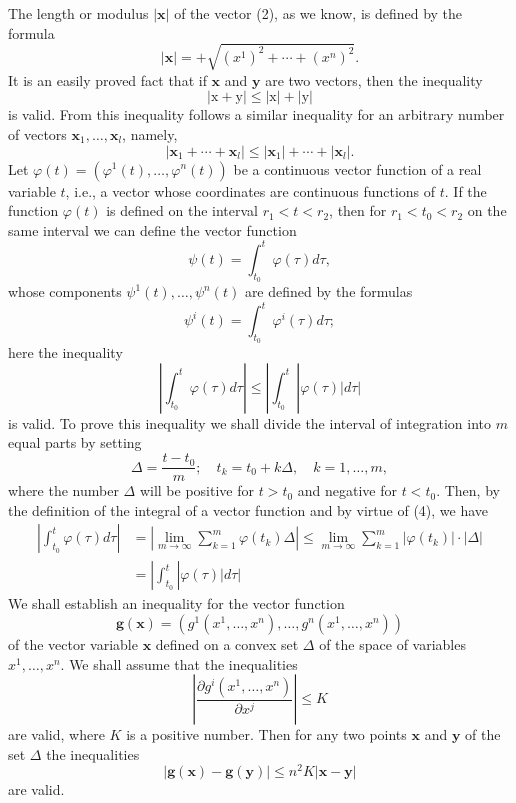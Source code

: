 \documentclass[10pt,a5paper]{book}
\theoremstyle{plain}
\theoremstyle{definition}
\theoremstyle{remark}
\begin{document}
The length or modulus $|\mathbf{x}|$ of the vector (2), as we know, is defined by the formula
\[
|\mathbf{x}|=+\sqrt{\left(x^{1}\right)^{2}+\cdots+\left(x^{n}\right)^{2}} .
\]
It is an easily proved fact that if $\mathbf{x}$ and $\mathbf{y}$ are two vectors, then the inequality
\[
|\mathrm{x}+\mathrm{y}| \leq|\mathrm{x}|+|\mathrm{y}|
\]
is valid. From this inequality follows a similar inequality for an arbitrary number of vectors $\mathbf{x}_{1}, \ldots, \mathbf{x}_{l}$, namely,
\begin{equation*}
\left|\mathbf{x}_{1}+\cdots+\mathbf{x}_{l}\right| \leq\left|\mathbf{x}_{1}\right|+\cdots+\left|\mathbf{x}_{l}\right| . \tag{4}
\end{equation*}
Let $\varphi(t)=\left(\varphi^{1}(t), \ldots, \varphi^{n}(t)\right)$ be a continuous vector function of a real variable $t$, i.e., a vector whose coordinates are continuous functions of $t$. If the function $\varphi(t)$ is defined on the interval $r_{1}<t<r_{2}$, then for $r_{1}<t_{0}<r_{2}$ on the same interval we can define the vector function
\[
\psi(t)=\int_{t_{0}}^{t} \varphi(\tau) d \tau,
\]
whose components $\psi^{1}(t), \ldots, \psi^{n}(t)$ are defined by the formulas
\[
\psi^{i}(t)=\int_{t_{0}}^{t} \varphi^{i}(\tau) d \tau ;
\]
here the inequality
\begin{equation*}
\left|\int_{t_{0}}^{t} \varphi(\tau) d \tau\right| \leq\left|\int_{t_{0}}^{t}\right| \varphi(\tau)|d \tau| \tag{5}
\end{equation*}
is valid. To prove this inequality we shall divide the interval of integration into $m$ equal parts by setting
\[
\Delta=\frac{t-t_{0}}{m} ; \quad t_{k}=t_{0}+k \Delta, \quad k=1, \ldots, m,
\]
where the number $\Delta$ will be positive for $t>t_{0}$ and negative for $t<t_{0}$. Then, by the definition of the integral of a vector function and by virtue
of (4), we have
\[
\begin{aligned}
\left|\int_{t_{0}}^{t} \varphi(\tau) d \tau\right| & =\left|\lim _{m \rightarrow \infty} \sum_{k=1}^{m} \varphi\left(t_{k}\right) \Delta\right| \leq \lim _{m \rightarrow \infty} \sum_{k=1}^{m}\left|\varphi\left(t_{k}\right)\right| \cdot|\Delta| \\
& =\left|\int_{t_{0}}^{t}\right| \varphi(\tau)|d \tau|
\end{aligned}
\]
We shall establish an inequality for the vector function
\[
\mathbf{g}(\mathbf{x})=\left(g^{1}\left(x^{1}, \ldots, x^{n}\right), \ldots, g^{n}\left(x^{1}, \ldots, x^{n}\right)\right)
\]
of the vector variable $\mathbf{x}$ defined on a convex set $\Delta$ of the space of variables $x^{1}, \ldots, x^{n}$. We shall assume that the inequalities
\[
\left|\frac{\partial g^{i}\left(x^{1}, \ldots, x^{n}\right)}{\partial x^{j}}\right| \leq K
\]
are valid, where $K$ is a positive number. Then for any two points $\mathbf{x}$ and $\mathbf{y}$ of the set $\Delta$ the inequalities
\begin{equation*}
|\mathbf{g}(\mathbf{x})-\mathbf{g}(\mathbf{y})| \leq n^{2} K|\mathbf{x}-\mathbf{y}| \tag{6}
\end{equation*}
are valid.
\end{document}
